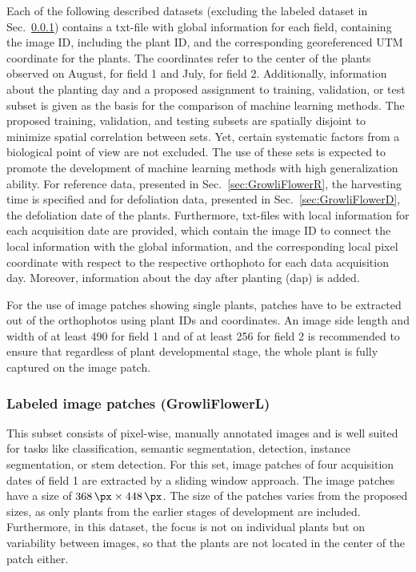 \documentclass{article}
\def\secref#1{Sec.~\ref{#1}}
\begin{document}
Each of the following described datasets (excluding the labeled dataset in \secref{sec:labeledData}) contains a txt-file with global information for each field, containing the image ID, including the plant ID, and the corresponding georeferenced UTM coordinate for the plants. The coordinates refer to the center of the plants observed on August,  for field 1 and July,  for field 2. Additionally, information about the planting day and a proposed assignment to training, validation, or test subset is given as the basis for the comparison of machine learning methods. 
The proposed training, validation, and testing subsets are spatially disjoint to minimize spatial correlation between sets. Yet, certain systematic factors from a biological point of view are not excluded. The use of these sets is expected to promote the development of machine learning methods with high generalization ability.
For reference data, presented in \secref{sec:GrowliFlowerR}, the harvesting time is specified and for defoliation data, presented in \secref{sec:GrowliFlowerD}, the defoliation date of the plants. 
Furthermore, txt-files with local information for each acquisition date are provided, which contain the image ID to connect the local information with the global information, and the corresponding local pixel coordinate with respect to the respective orthophoto for each data acquisition day. Moreover, information about the day after planting (dap) is added. 

For the use of image patches showing single plants, patches have to be extracted out of the orthophotos using plant IDs and coordinates. An image side length and width of at least \SI{490}{\px} for field 1 and of at least \SI{256}{\px} for field 2 is recommended to ensure that regardless of plant developmental stage, the whole plant is fully captured on the image patch. 



\subsubsection{Labeled image patches (GrowliFlowerL)}\label{sec:labeledData}
This subset consists of pixel-wise, manually annotated images and is well suited for tasks like classification, semantic segmentation, detection, instance segmentation, or stem detection.
For this set, image patches of four acquisition dates of field 1 are extracted by a sliding window approach. 
The image patches have a size of $\SI{368}{\px} \times \SI{448}{\px}$. The size of the patches varies from the proposed sizes, as only plants from the earlier stages of development are included. Furthermore, in this dataset, the focus is not on individual plants but on variability between images, so that the plants are not located in the center of the patch either.
\end{document}
